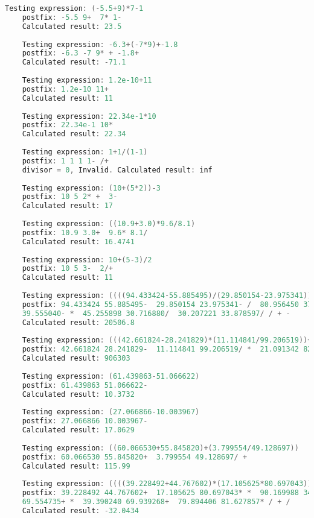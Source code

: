 \documentclass[UTF8]{ctexart}
\begin{document}
\begin{lstlisting}[language=c++, breaklines=true, frame=shadowbox, rulesepcolor=\color{red!20!green!20!blue!20}]
    Testing expression: (-5.5+9)*7-1
    postfix: -5.5 9+  7* 1-
    Calculated result: 23.5
    
    Testing expression: -6.3+(-7*9)+-1.8
    postfix: -6.3 -7 9* + -1.8+
    Calculated result: -71.1
    
    Testing expression: 1.2e-10+11
    postfix: 1.2e-10 11+
    Calculated result: 11
    
    Testing expression: 22.34e-1*10
    postfix: 22.34e-1 10*
    Calculated result: 22.34
    
    Testing expression: 1+1/(1-1)
    postfix: 1 1 1 1- /+
    divisor = 0, Invalid. Calculated result: inf
    
    Testing expression: (10+(5*2))-3
    postfix: 10 5 2* +  3-
    Calculated result: 17
    
    Testing expression: ((10.9+3.0)*9.6/8.1)
    postfix: 10.9 3.0+  9.6* 8.1/
    Calculated result: 16.4741
    
    Testing expression: 10+(5-3)/2
    postfix: 10 5 3-  2/+
    Calculated result: 11
    
    Testing expression: ((((94.433424-55.885495)/(29.850154-23.975341))/((80.956450+37.028108)/(99.420148/75.145726)))-(((15.982543*81.200598)*(23.752556-39.555040))+((45.255898/30.716880)/(30.207221/33.878597))))
    postfix: 94.433424 55.885495-  29.850154 23.975341- /  80.956450 37.028108+  99.420148 75.145726/ / /  15.982543 81.200598*  23.752556 
    39.555040- *  45.255898 30.716880/  30.207221 33.878597/ / + -
    Calculated result: 20506.8
    
    Testing expression: (((42.661824-28.241829)*(11.114841/99.206519))+((21.091342*82.714316)*(5.719169*90.835292)))
    postfix: 42.661824 28.241829-  11.114841 99.206519/ *  21.091342 82.714316*  5.719169 90.835292* * +
    Calculated result: 906303
    
    Testing expression: (61.439863-51.066622)
    postfix: 61.439863 51.066622-
    Calculated result: 10.3732
    
    Testing expression: (27.066866-10.003967)
    postfix: 27.066866 10.003967-
    Calculated result: 17.0629
    
    Testing expression: ((60.066530+55.845820)+(3.799554/49.128697))
    postfix: 60.066530 55.845820+  3.799554 49.128697/ +
    Calculated result: 115.99
    
    Testing expression: ((((39.228492+44.767602)*(17.105625*80.697043))+((90.169988*34.827723)/(87.859737*76.461074)))/(((31.388287-61.305582)*(51.393170+69.554735))+((39.390240+69.939268)/(79.894406*81.627857))))
    postfix: 39.228492 44.767602+  17.105625 80.697043* *  90.169988 34.827723*  87.859737 76.461074* / +  31.388287 61.305582-  51.393170 
    69.554735+ *  39.390240 69.939268+  79.894406 81.627857* / + /
    Calculated result: -32.0434
    

\end{lstlisting}
\end{document}
